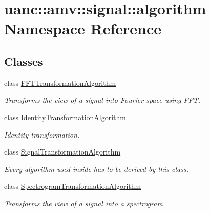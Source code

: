 \hypertarget{namespaceuanc_1_1amv_1_1signal_1_1algorithm}{}\section{uanc\+:\+:amv\+:\+:signal\+:\+:algorithm Namespace Reference}
\label{namespaceuanc_1_1amv_1_1signal_1_1algorithm}
\subsection*{Classes}
\begin{DoxyCompactItemize}
\item 
class \hyperlink{classuanc_1_1amv_1_1signal_1_1algorithm_1_1_f_f_t_transformation_algorithm}{F\+F\+T\+Transformation\+Algorithm}
\begin{DoxyCompactList}\small\item\em Transforms the view of a signal into Fourier space using F\+FT. \end{DoxyCompactList}\item 
class \hyperlink{classuanc_1_1amv_1_1signal_1_1algorithm_1_1_identity_transformation_algorithm}{Identity\+Transformation\+Algorithm}
\begin{DoxyCompactList}\small\item\em Identity transformation. \end{DoxyCompactList}\item 
class \hyperlink{classuanc_1_1amv_1_1signal_1_1algorithm_1_1_signal_transformation_algorithm}{Signal\+Transformation\+Algorithm}
\begin{DoxyCompactList}\small\item\em Every algorithm used inside has to be derived by this class. \end{DoxyCompactList}\item 
class \hyperlink{classuanc_1_1amv_1_1signal_1_1algorithm_1_1_spectrogram_transformation_algorithm}{Spectrogram\+Transformation\+Algorithm}
\begin{DoxyCompactList}\small\item\em Transforms the view of a signal into a spectrogram. \end{DoxyCompactList}\end{DoxyCompactItemize}
